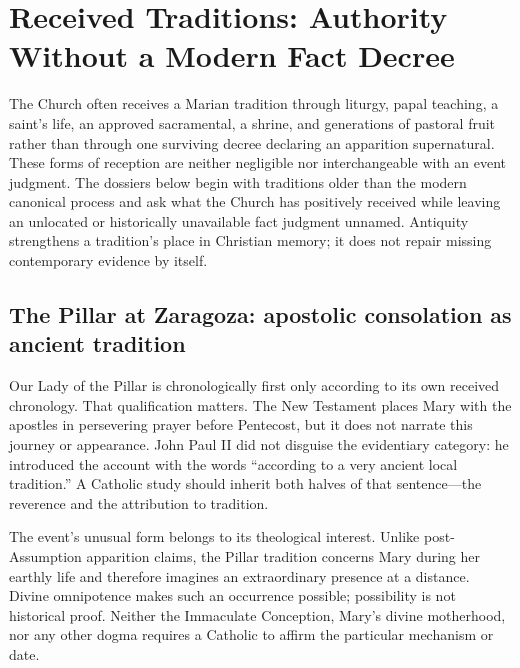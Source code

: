 \section{Received Traditions: Authority Without a Modern Fact Decree}

The Church often receives a Marian tradition through liturgy, papal teaching, a saint's life, an approved sacramental, a shrine, and generations of pastoral fruit rather than through one surviving decree declaring an apparition supernatural. These forms of reception are neither negligible nor interchangeable with an event judgment. The dossiers below begin with traditions older than the modern canonical process and ask what the Church has positively received while leaving an unlocated or historically unavailable fact judgment unnamed. Antiquity strengthens a tradition's place in Christian memory; it does not repair missing contemporary evidence by itself.

\subsection{The Pillar at Zaragoza: apostolic consolation as ancient tradition}


Our Lady of the Pillar is chronologically first only according to its own received chronology. That qualification matters. The New Testament places Mary with the apostles in persevering prayer before Pentecost, but it does not narrate this journey or appearance. John Paul II did not disguise the evidentiary category: he introduced the account with the words ``according to a very ancient local tradition.'' A Catholic study should inherit both halves of that sentence---the reverence and the attribution to tradition.

The event's unusual form belongs to its theological interest. Unlike post-Assumption apparition claims, the Pillar tradition concerns Mary during her earthly life and therefore imagines an extraordinary presence at a distance. Divine omnipotence makes such an occurrence possible; possibility is not historical proof. Neither the Immaculate Conception, Mary's divine motherhood, nor any other dogma requires a Catholic to affirm the particular mechanism or date.

